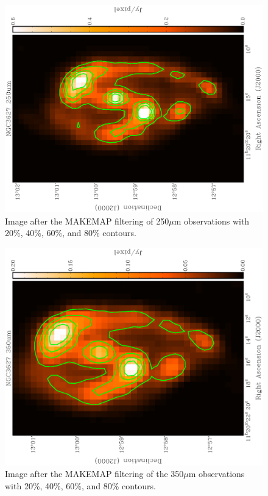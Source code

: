 \begin{figure}
  \centering
  \includegraphics[width=1.\textwidth,angle=270]{obs_imgs/250_um.eps}
  \caption[NGC3627 250$\mu$m Observations]{Image after the MAKEMAP filtering of 250$\mu$m observations with 20\%, 40\%, 60\%, and 80\% contours.}
  \label{fig_250}
\end{figure}

\begin{figure}
  \centering
  \includegraphics[width=1.\textwidth,angle=270]{obs_imgs/350_um.eps}
  \caption[NGC3627 350$\mu$m Observations]{Image after the MAKEMAP filtering of the 350$\mu$m observations with 20\%, 40\%, 60\%, and 80\% contours.}
  \label{fig_350}
\end{figure}

